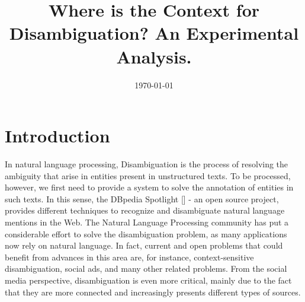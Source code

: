 \documentclass[10pt,a4paper]{article}
\title{Where is the Context for Disambiguation? An Experimental Analysis.}
\date{\today}
\newcommand{\todo}[1]{{\color{red}\textsf{\textbf{TODO}}: #1}}
\begin{document}
\maketitle





\section{Introduction}


In natural language processing, Disambiguation is the process of resolving  the ambiguity  that arise in entities present in unstructured texts. To be processed, however, we first need to provide a system to solve the annotation of entities in such texts.  In this sense, the DBpedia Spotlight [] -  an open source project, provides different techniques to recognize  and disambiguate natural language mentions in the Web. The Natural Language Processing community has put a considerable effort to solve the disambiguation problem, as many applications now rely on natural language. In fact, current and open problems that could  benefit from advances in this area are, for instance, context-sensitive  disambiguation, social ads, and many other related problems. From the social media perspective, disambiguation is even more critical, mainly due to the fact that they are more connected and increasingly presents different types of sources.
\end{document}
